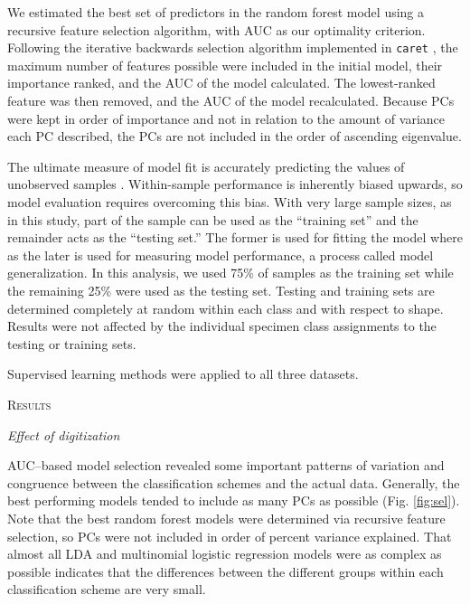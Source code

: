 \documentclass[12pt,letterpaper]{article}
\renewcommand{\section}[1]{%
\bigskip
\begin{center}
\begin{Large}
\normalfont\scshape #1
\medskip
\end{Large}
\end{center}}
\renewcommand{\subsection}[1]{%
\bigskip
\begin{center}
\begin{large}
\normalfont\itshape #1
\end{large}
\end{center}}
\begin{document}
We estimated the best set of predictors in the random forest model using a recursive feature selection algorithm, with AUC as our optimality criterion. Following the iterative backwards selection algorithm implemented in \texttt{caret} \citep{KuhnMAN2013}, the maximum number of features possible were included in the initial model, their importance ranked, and the AUC of the model calculated. The lowest-ranked feature was then removed, and the AUC of the model recalculated. Because PCs were kept in order of importance and not in relation to the amount of variance each PC described, the PCs are not included in the order of ascending eigenvalue.

The ultimate measure of model fit is accurately predicting the values of unobserved samples \citep{Hastie2009,Kuhn2013}. Within-sample performance is inherently biased upwards, so model evaluation requires overcoming this bias. With very large sample sizes, as in this study, part of the sample can be used as the ``training set'' and the remainder acts as the ``testing set.'' The former is used for fitting the model where as the later is used for measuring model performance, a process called model generalization. In this analysis, we used 75\% of samples as the training set while the remaining 25\% were used as the testing set. Testing and training sets are determined completely at random within each class and with respect to shape. Results were not affected by the individual specimen class assignments to the testing or training sets.

Supervised learning methods were applied to all three datasets.


\section{Results}

\subsection{Effect of digitization}




AUC--based model selection revealed some important patterns of variation and congruence between the classification schemes and the actual data. Generally, the best performing models tended to include as many PCs as possible (Fig. \ref{fig:sel}). Note that the best random forest models were determined via recursive feature selection, so PCs were not included in order of percent variance explained. That almost all LDA and multinomial logistic regression models were as complex as possible indicates that the differences between the different groups within each classification scheme are very small.
\end{document}
